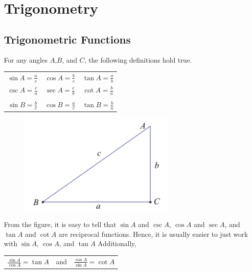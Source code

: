 \section{Trigonometry}

    \subsection{Trigonometric Functions}
        For any angles $A$,$B$, and $C$, the following definitions hold true. \\

        \begin{center}
            \begin{tabular}{ccc}
                $\sin A = \frac{a}{c}$
                & $\cos A = \frac{b}{c}$
                & $\tan A = \frac{a}{b}$ \\
                $\csc A = \frac{c}{a}$
                & $\sec A = \frac{c}{b}$
                & $\cot A = \frac{b}{a}$\\\\
                $\sin B = \frac{b}{c}$
                & $\cos B = \frac{a}{c}$
                & $\tan B = \frac{b}{a}$
            \end{tabular}
        \end{center}

        \begin{figure} [h]
            \centering
            \includegraphics [scale=0.4] {Resources/Unit2Trig/Trig.fig1.png}
        \end{figure}

        \noindent From the figure, it is easy to tell that $\sin A$ and $\csc A$, $\cos A$ and
        $\sec A$, and $\tan A$ and $\cot A$ are reciprocal functions. Hence, it is usually
        easier to just work with $\sin A$, $\cos A$, and $\tan A$ Additionally,

        \begin{center}
            \begin{tabular}{ccc}
                $\frac{\sin A}{\cos A}=\tan A$
                & and &
                $\frac{\cos A}{\sin A}=\cot A$
            \end{tabular}
        \end{center}

